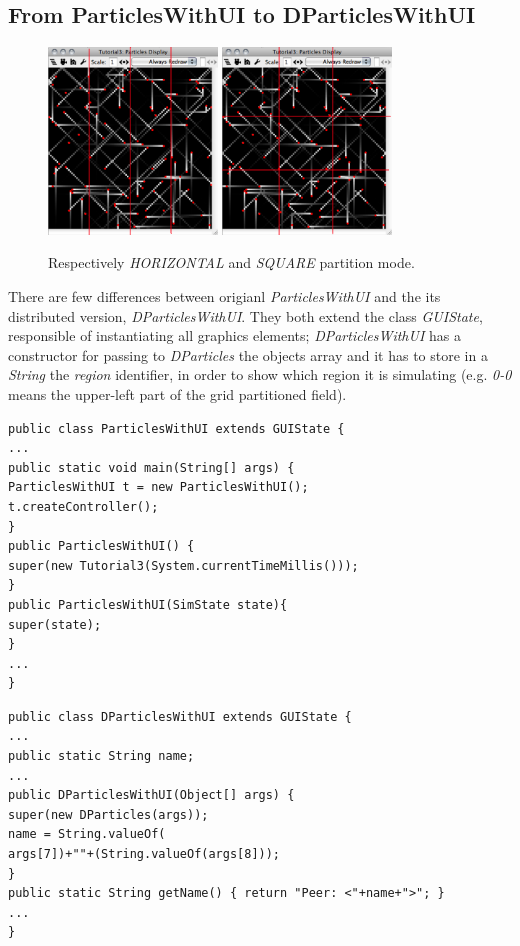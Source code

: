 \documentclass[12pt]{article}
\begin{document}
\subsection{From ParticlesWithUI to DParticlesWithUI}
\begin{figure}
\centering
\includegraphics[width=0.4\textwidth,bb=0 0 470 520]{particles-h.png} 
\includegraphics[width=0.4\textwidth,bb=0 0 470 520]{particles-m.png}
\caption{Respectively \textit{HORIZONTAL} and \textit{SQUARE} partition mode.}
\label{fig:dp01}
\end{figure}
There are few differences between origianl \textit{ParticlesWithUI} and the its distributed version, \textit{DParticlesWithUI}. They both extend the class \textit{GUIState}, responsible of instantiating all graphics elements; \textit{DParticlesWithUI} has a constructor for passing to \textit{DParticles} the objects array and it has to store in a \textit{String} the \textit{region} identifier, in order to show which region it is simulating (e.g. \textit{0-0} means the upper-left part of the grid partitioned field).
\begin{lstlisting}
public class ParticlesWithUI extends GUIState {
...
public static void main(String[] args) {
ParticlesWithUI t = new ParticlesWithUI();
t.createController();
}
public ParticlesWithUI() { 
super(new Tutorial3(System.currentTimeMillis()));
}
public ParticlesWithUI(SimState state){
super(state);
}
...
}
\end{lstlisting}
\medskip
{}
\begin{lstlisting}
public class DParticlesWithUI extends GUIState {
...
public static String name;
...
public DParticlesWithUI(Object[] args) {
super(new DParticles(args));
name = String.valueOf(
args[7])+""+(String.valueOf(args[8]));
}
public static String getName() { return "Peer: <"+name+">"; }
...
}
\end{lstlisting}
\end{document}
